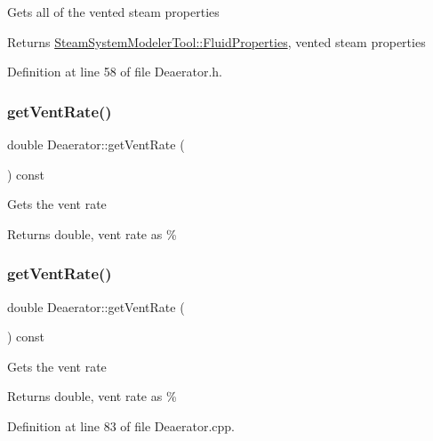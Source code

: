 Gets all of the vented steam properties \begin{DoxyReturn}{Returns}
\hyperlink{struct_steam_system_modeler_tool_1_1_fluid_properties}{Steam\+System\+Modeler\+Tool\+::\+Fluid\+Properties}, vented steam properties 
\end{DoxyReturn}


Definition at line 58 of file Deaerator.\+h.

\mbox{\label{class_deaerator_ad0262491c2bd9a6f820eaaba54498bcd}} 
\subsubsection{\texorpdfstring{get\+Vent\+Rate()}{getVentRate()}\hspace{0.1cm}{\footnotesize\ttfamily [1/3]}}
{\footnotesize\ttfamily double Deaerator\+::get\+Vent\+Rate (\begin{DoxyParamCaption}{ }\end{DoxyParamCaption}) const}

Gets the vent rate \begin{DoxyReturn}{Returns}
double, vent rate as \% 
\end{DoxyReturn}
\mbox{\label{class_deaerator_ad0262491c2bd9a6f820eaaba54498bcd}} 
\subsubsection{\texorpdfstring{get\+Vent\+Rate()}{getVentRate()}\hspace{0.1cm}{\footnotesize\ttfamily [2/3]}}
{\footnotesize\ttfamily double Deaerator\+::get\+Vent\+Rate (\begin{DoxyParamCaption}{ }\end{DoxyParamCaption}) const}

Gets the vent rate \begin{DoxyReturn}{Returns}
double, vent rate as \% 
\end{DoxyReturn}


Definition at line 83 of file Deaerator.\+cpp.

\mbox{\label{class_deaerator_ad0262491c2bd9a6f820eaaba54498bcd}} 
